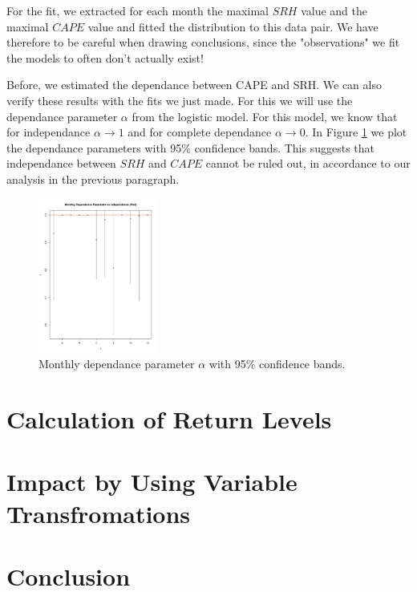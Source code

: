 \documentclass[10pt,conference,compsocconf]{IEEEtran}
\begin{document}
For the fit, we extracted for each month the maximal $SRH$ value and the maximal $CAPE$ value and fitted the distribution to this data pair. We have therefore to be careful when drawing conclusions, since the "observations" we fit the models to often don't actually exist!

Before, we estimated the dependance between CAPE and SRH. We can also verify these results with the fits we just made. For this we will use the dependance parameter $\alpha$ from the logistic model. For this model, we know that for independance $\alpha \to 1$ and for complete dependance $\alpha \to 0$. In Figure \ref{fig:cape_srh_dependance_logistic} we plot the dependance parameters with 95\% confidence bands. This suggests that independance between $SRH$ and $CAPE$ cannot be ruled out, in accordance to our analysis in the previous paragraph.

\begin{figure}
	\centering
	\includegraphics[width=0.35\textwidth]{../plots/dependance_parameter_cape_srh_logistic.pdf}
	\caption{Monthly dependance parameter $\alpha$ with 95\% confidence bands.}
	\label{fig:cape_srh_dependance_logistic}
\end{figure}

\section*{Calculation of Return Levels}

\section*{Impact by Using Variable Transfromations}

\section*{Conclusion}







	
\end{document}
